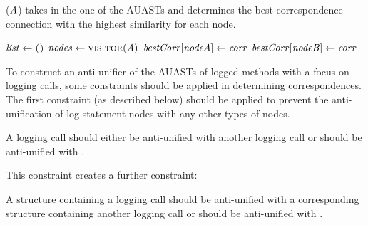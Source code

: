 
\begin{algorithm}
\caption{($\mathit{A}$) takes in the one of the AUASTs and determines the best correspondence connection with the highest similarity for each node.}
\label{alg-determine}
\begin{algorithmic}[1]
\DetermineBest
    \State $\mathit{list} \gets \textsc{()}$
    \State $\mathit{nodes} \gets \textsc{visitor}(\mathit{A})$
			 	\EndFor  	
	   \EndFor	
	   		\State $\mathit{bestCorr}[\mathit{nodeA}] \gets \mathit{corr}$
	   		\State $\mathit{bestCorr}[\mathit{nodeB}] \gets \mathit{corr}$
	   \EndFor
  \end{algorithmic}
\end{algorithm}

To construct an anti-unifier of the AUASTs of logged methods with a focus on logging calls, some constraints should be applied in determining correspondences. The first constraint (as described below) should be applied to prevent the anti-unification of log statement nodes with any other types of nodes.
\begin{constraint}
A logging call should either be anti-unified with another logging call or should be anti-unified with \nothing.
\end{constraint}	
	
This constraint creates a further constraint:

\begin{constraint}
A structure containing a logging call should be anti-unified with a corresponding structure containing another logging call or should be anti-unified with \nothing.
\end{constraint}


